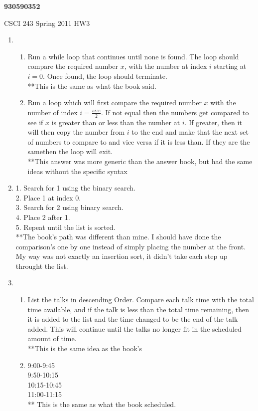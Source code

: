 \documentclass{article}
\begin{document}
\begin{center}
{\bf 930590352}

CSCI 243 Spring 2011 HW3
\end{center}
\begin{enumerate}

\item 
		\begin{enumerate}
		\item Run a while loop that continues until none is found. The loop should compare the required number $x$, with the number at index $i$ starting at $i=0$. Once found, the loop should terminate.\\
		**This is the same as what the book said.
		\item Run a loop which will first compare the required number $x$ with the number of index $i=\frac{size}{2}$. If not equal then the numbers get compared to see if $x$ is greater than or less than the number at $i$. If greater, then it will then copy the number from $i$ to the end and make that the next set of numbers to compare to and vice versa if it is less than. If they are the samethen the loop will exit. \\
		**This answer was more generic than the answer book, but had the same ideas without the specific syntax
		\end{enumerate} 

\item
	1. Search for 1 using the binary search. \\
	2. Place 1 at index 0.  \\
	3. Search for 2 using binary search. \\
	4. Place 2 after 1. \\
	5. Repeat until the list is sorted. \\
	**The book's path was different than mine. I should have done the comparison's one by one instead of simply placing the number at the front. My way was not exactly an insertion sort, it didn't take each step up throught the list.

\item
	\begin{enumerate}
	\item List the talks in descending Order. Compare each talk time with the total time available, and if the talk is less than the total time remaining, then it is added to the list and the time changed to be the end of the talk added. This will continue until the talks no longer fit in the scheduled amount of time. \\
	**This is the same idea as the book's
	\item 9:00-9:45 \\
				9:50-10:15 \\
				10:15-10:45 \\
				11:00-11:15 \\
	** This is the same as what the book scheduled.
	\end{enumerate}


\end{enumerate}
\end{document}
